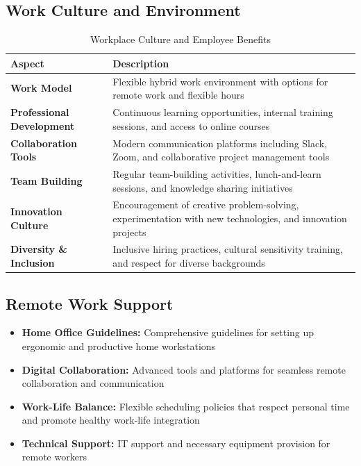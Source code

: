 \documentclass[12pt,a4paper]{report}
\newcommand{\tableheaderrow}{\rowcolor{tableheader}}
\newcommand{\tablealtrow}{\rowcolor{tablealt1}}
\newcommand{\tech}[1]{\textcolor{techcolor}{\textbf{#1}}}
\newcommand{\skill}[1]{\textcolor{skillcolor}{\textbf{#1}}}
\newcommand{\tool}[1]{\textcolor{toolcolor}{\textbf{#1}}}
\newcommand{\feature}[1]{\textcolor{featurecolor}{\textbf{#1}}}
\newcommand{\impact}[1]{\textcolor{impactcolor}{\textbf{#1}}}
\newenvironment{coloritemize}
{\begin{itemize}[label=\textcolor{primaryblue}{$\bullet$}]}
{\end{itemize}}
\begin{document}
\subsection{Work Culture and Environment}
\begin{table}[h!]
\centering
\caption{Workplace Culture and Employee Benefits}
\label{tab:workplace_culture}
\begin{tabular}{p{5.5cm} p{8.5cm}}
\toprule
\tableheaderrow \textcolor{headertext}{\textbf{Aspect}} & \textcolor{headertext}{\textbf{Description}} \\
\midrule
\tablealtrow \impact{Work Model} & Flexible hybrid work environment with options for remote work and flexible hours \\
\skill{Professional Development} & Continuous learning opportunities, internal training sessions, and access to online courses \\
\tablealtrow \tool{Collaboration Tools} & Modern communication platforms including Slack, Zoom, and collaborative project management tools \\
\feature{Team Building} & Regular team-building activities, lunch-and-learn sessions, and knowledge sharing initiatives \\
\tablealtrow \tech{Innovation Culture} & Encouragement of creative problem-solving, experimentation with new technologies, and innovation projects \\
\impact{Diversity \& Inclusion} & Inclusive hiring practices, cultural sensitivity training, and respect for diverse backgrounds \\
\bottomrule
\end{tabular}
\end{table}

\subsection{Remote Work Support}
\begin{coloritemize}
    \item \skill{Home Office Guidelines:} Comprehensive guidelines for setting up ergonomic and productive home workstations
    \item \skill{Digital Collaboration:} Advanced tools and platforms for seamless remote collaboration and communication
    \item \skill{Work-Life Balance:} Flexible scheduling policies that respect personal time and promote healthy work-life integration
    \item \skill{Technical Support:} IT support and necessary equipment provision for remote workers
\end{coloritemize}
\end{document}
